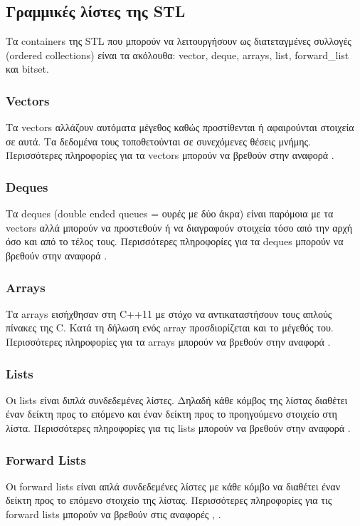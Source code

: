 \subsection{Γραμμικές λίστες της STL}
Τα containers της STL που μπορούν να λειτουργήσουν ως διατεταγμένες συλλογές (ordered collections) είναι τα ακόλουθα: vector, deque, arrays, list, forward\_list και bitset. 

\subsubsection{Vectors}
Τα vectors αλλάζουν αυτόματα μέγεθος καθώς προστίθενται ή αφαιρούνται στοιχεία σε αυτά. Τα δεδομένα τους τοποθετούνται σε συνεχόμενες θέσεις μνήμης. Περισσότερες πληροφορίες για τα vectors μπορούν να βρεθούν στην αναφορά \cite{g4gvector}.

\subsubsection{Deques}
Τα deques (double ended queues = ουρές με δύο άκρα) είναι παρόμοια με τα vectors αλλά μπορούν να προστεθούν ή να διαγραφούν στοιχεία τόσο από την αρχή όσο και από το τέλος τους. Περισσότερες πληροφορίες για τα deques μπορούν να βρεθούν στην αναφορά \cite{g4gdeque}.

\subsubsection{Arrays}
Τα arrays εισήχθησαν στη C++11 με στόχο να αντικαταστήσουν τους απλούς πίνακες της C. Κατά τη δήλωση ενός array προσδιορίζεται και το μέγεθός του. Περισσότερες πληροφορίες για τα arrays μπορούν να βρεθούν στην αναφορά \cite{g4garray}.

\subsubsection{Lists}
Οι lists είναι διπλά συνδεδεμένες λίστες. Δηλαδή κάθε κόμβος της λίστας διαθέτει έναν δείκτη προς το επόμενο και έναν δείκτη προς το προηγούμενο στοιχείο στη λίστα. Περισσότερες πληροφορίες για τις lists μπορούν να βρεθούν στην αναφορά \cite{g4glist}.

\subsubsection{Forward Lists}
Οι forward lists είναι απλά συνδεδεμένες λίστες με κάθε κόμβο να διαθέτει έναν δείκτη προς το επόμενο στοιχείο της λίστας. Περισσότερες πληροφορίες για τις forward lists μπορούν να βρεθούν στις αναφορές \cite{g4gforwardlist1}, \cite{g4gforwardlist2}.

